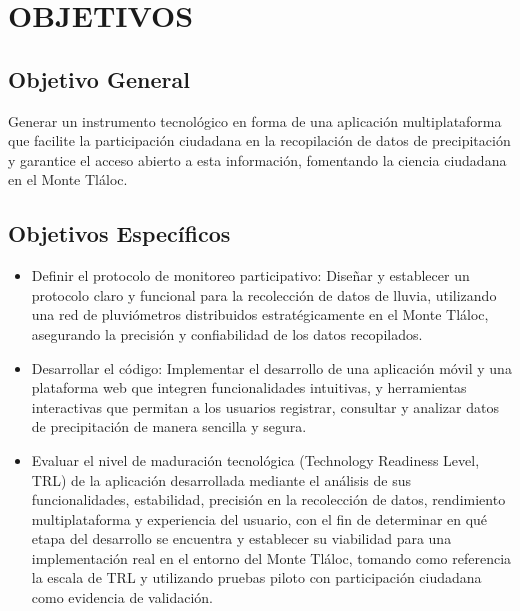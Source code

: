 \chapter{OBJETIVOS}
\section{Objetivo General}

Generar un instrumento tecnológico en forma de una aplicación multiplataforma que facilite la participación ciudadana en la recopilación de datos de precipitación y garantice el acceso abierto a esta información, fomentando la ciencia ciudadana en el Monte Tláloc.

\section{Objetivos Específicos}

\begin{itemize}
    \item Definir el protocolo de monitoreo participativo: Diseñar y establecer un protocolo claro y funcional para la recolección de datos de lluvia, utilizando una red de pluviómetros distribuidos estratégicamente en el Monte Tláloc, asegurando la
    precisión y confiabilidad de los datos recopilados.
    \item Desarrollar el código: Implementar el desarrollo de una aplicación móvil y una plataforma web que integren funcionalidades intuitivas, y herramientas interactivas que permitan a los usuarios registrar, consultar y analizar datos de precipitación de
    manera sencilla y segura.
    \item Evaluar el nivel de maduración tecnológica (Technology Readiness Level, TRL) de la aplicación desarrollada mediante el análisis de sus funcionalidades, estabilidad, precisión en la recolección de datos, rendimiento multiplataforma y experiencia del usuario, con el fin de determinar en qué etapa del desarrollo se encuentra y establecer su viabilidad para una implementación real en el entorno del Monte Tláloc, tomando como referencia la escala de TRL y utilizando pruebas piloto con participación ciudadana como evidencia de validación.
\end{itemize}